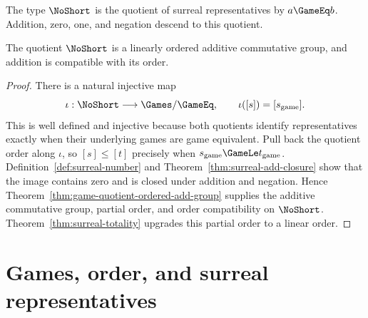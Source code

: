 \begin{definition}
  \label{def:surreal-number}
  \leanok
  The type \(\NoShort\) is the quotient of surreal representatives by \(a\GameEq b\).
  Addition, zero, one, and negation descend to this quotient.
\end{definition}

\begin{theorem}
  \label{thm:ordered-add-group}
  \leanok
  The quotient \(\NoShort\) is a linearly ordered additive commutative group, and addition is
  compatible with its order.
\end{theorem}
\begin{proof}
  \leanok
  There is a natural injective map
  \[
    \iota:\NoShort\longrightarrow\Games/{\GameEq},
    \qquad \iota([s])=[s_{\mathrm{game}}].
  \]
  This is well defined and injective because both quotients identify representatives exactly
  when their underlying games are game equivalent.  Pull back the quotient order along
  \(\iota\), so \([s]\leq[t]\) precisely when
  \(s_{\mathrm{game}}\GameLe t_{\mathrm{game}}\).  Definition~\ref{def:surreal-number} and
  Theorem~\ref{thm:surreal-add-closure} show that the image contains zero and is closed under
  addition and negation.  Hence Theorem~\ref{thm:game-quotient-ordered-add-group} supplies the
  additive commutative group, partial order, and order compatibility on \(\NoShort\).
  Theorem~\ref{thm:surreal-totality} upgrades this partial order to a linear order.
\end{proof}









\chapter{Games, order, and surreal representatives}

